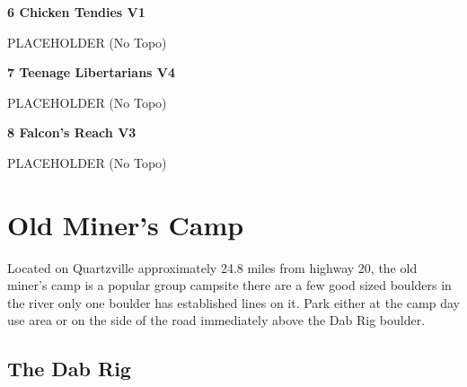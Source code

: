 \begin{multicols*}{2}
					\label{rt:Chicken Tendies}\colorbox{green!20}{\textbf{6 Chicken Tendies V1   }}
					\begin{adjustwidth}{0.5cm}{}
					\begin{minipage}{\linewidth}					
					PLACEHOLDER
						\newline (No Topo) 
					\end{minipage}
					\end{adjustwidth}
					\label{rt:Teenage Libertarians}\colorbox{RoyalBlue!20}{\textbf{7 Teenage Libertarians V4 \ding{72}    }}
					\begin{adjustwidth}{0.5cm}{}
					\begin{minipage}{\linewidth}					
					PLACEHOLDER
						\newline (No Topo) 
					\end{minipage}
					\end{adjustwidth}
					\label{rt:Falcon's Reach}\colorbox{green!20}{\textbf{8 Falcon's Reach V3   }}
					\begin{adjustwidth}{0.5cm}{}
					\begin{minipage}{\linewidth}					
					PLACEHOLDER
						\newline (No Topo) 
					\end{minipage}
					\end{adjustwidth}
		\section{Old Miner's Camp}\label{sa:Old Miner's Camp}
	\begin{minipage}{\columnwidth}
	Located on Quartzville approximately 24.8 miles from highway 20, the old miner's camp is a popular group campsite there are a few good sized boulders in the river only one boulder has established lines on it. Park either at the camp day use area or on the side of the road immediately above the Dab Rig boulder.
	\end{minipage}
			\subsection*{The Dab Rig}\label{bf:The Dab Rig}
			\begin{minipage}{\columnwidth}
			\
			\end{minipage}
			

\end{multicols*}
